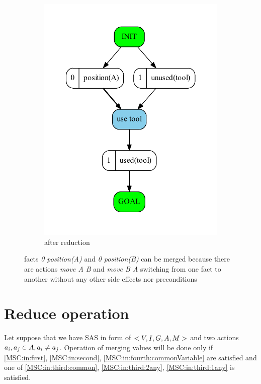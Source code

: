 \begin{figure}
\begin{subfigure}[b]{0.4\textwidth}
			\includegraphics[scale=0.4]{mergingValues/figures/simple_output}
			\caption{after reduction}
		\end{subfigure}
		\caption{facts \emph{0 position(A)} and \emph{0 position(B)} can be merged because there are actions \emph{move A B} and \emph{move B A} switching from one fact to another without any other side effects nor preconditions}
	\end{figure}
	
	
	\section{Reduce operation}
	
	Let suppose that we have SAS in form of $<V, I, G, A, M{}>$ and two actions $a_i, a_j \in A, a_i \neq a_j$. Operation of merging values will be done only if \ref{MSC:in:first}, \ref{MSC:in:second}, \ref{MSC:in:fourth:commonVariable} are satisfied and one of \ref{MSC:in:third:common}, \ref{MSC:in:third:2any}, \ref{MSC:in:third:1any} is satisfied.
	
